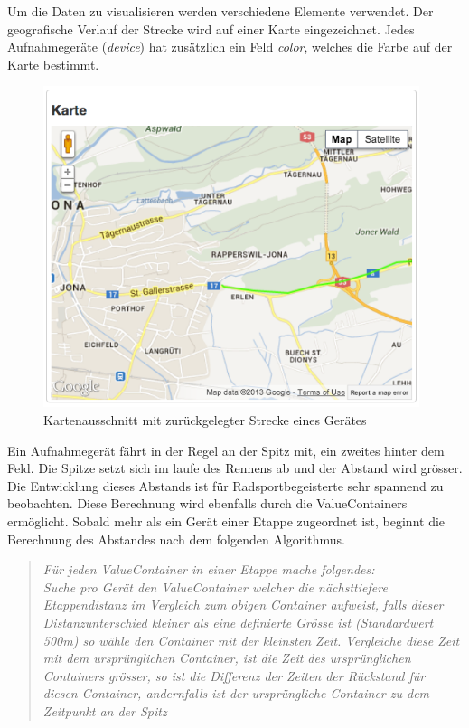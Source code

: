 Um die Daten zu visualisieren werden verschiedene Elemente verwendet. Der geografische Verlauf der Strecke wird auf einer Karte eingezeichnet. Jedes Aufnahmegeräte (\textit{device}) hat zusätzlich ein Feld \textit{color}, welches die Farbe auf der Karte bestimmt.
\begin{figure}[H]
	\centering
	\includegraphics[width=110mm]{images/tourliveweb/karte_neu.png}
	\caption{Kartenausschnitt mit zurückgelegter Strecke eines Gerätes}
\end{figure}

Ein Aufnahmegerät fährt in der Regel an der Spitz mit, ein zweites hinter dem Feld. Die Spitze setzt sich im laufe des Rennens ab und der Abstand wird grösser. Die Entwicklung dieses Abstands ist für Radsportbegeisterte sehr spannend zu beobachten. Diese Berechnung wird ebenfalls durch die ValueContainers ermöglicht. Sobald mehr als ein Gerät einer Etappe zugeordnet ist, beginnt die Berechnung des Abstandes nach dem folgenden Algorithmus.
\begin{quotation}
\textit{Für jeden ValueContainer in einer Etappe mache folgendes:
\\

Suche pro Gerät den ValueContainer welcher die nächsttiefere Etappendistanz im Vergleich zum obigen Container aufweist, falls dieser Distanzunterschied kleiner als eine definierte Grösse ist (Standardwert 500m) so wähle den Container mit der kleinsten Zeit. Vergleiche diese Zeit mit dem ursprünglichen Container, ist die Zeit des ursprünglichen Containers grösser, so ist die Differenz der Zeiten der Rückstand für diesen Container, andernfalls ist der ursprüngliche Container zu dem Zeitpunkt an der Spitz}
\end{quotation}

